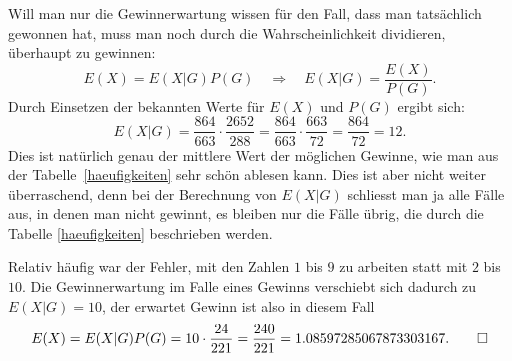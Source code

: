 \begin{loesung}
\begin{teilaufgaben}
Will man nur die Gewinnerwartung wissen für den Fall, dass
man tatsächlich gewonnen hat, muss man noch durch die
Wahrscheinlichkeit dividieren, überhaupt zu gewinnen:
\[
E(X)=E(X|G)P(G)\quad\Rightarrow\quad E(X|G)=\frac{E(X)}{P(G)}.
\]
Durch Einsetzen der bekannten Werte für $E(X)$ und $P(G)$
ergibt sich:
\[
E(X|G)
=
\frac{864}{663}\cdot\frac{2652}{288}
=
\frac{864}{663}\cdot\frac{663}{72}
=
\frac{864}{72}=
12.
\]
Dies ist natürlich genau der mittlere Wert der möglichen
Gewinne, wie man aus der Tabelle~\ref{haeufigkeiten}
sehr schön ablesen kann. Dies ist aber nicht weiter
überraschend, denn bei der Berechnung von $E(X|G)$
schliesst man ja alle Fälle aus, in denen man nicht
gewinnt, es bleiben nur die Fälle übrig, die durch
die Tabelle \ref{haeufigkeiten} beschrieben werden.

Relativ häufig war der Fehler, mit den Zahlen $1$ bis $9$
zu arbeiten statt mit $2$ bis $10$. Die Gewinnerwartung
im Falle eines Gewinns verschiebt sich dadurch zu
$E(X|G)=10$, der erwartet Gewinn ist also in diesem Fall
\[
E(X)=E(X|G)P(G)=10\cdot\frac{24}{221}=\frac{240}{221}=
1.08597285067873303167.
\qedhere
\]
\end{teilaufgaben}
\end{loesung}

